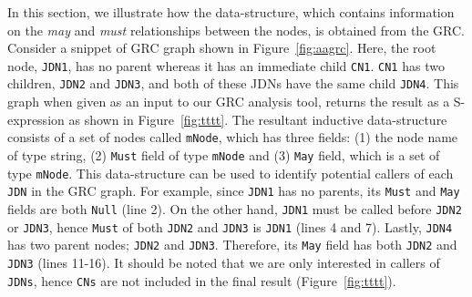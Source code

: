 In this section, we illustrate how the data-structure, which contains
information on the \textit{may} and \textit{must} relationships between
the nodes, is obtained from the GRC. Consider a snippet of GRC graph
shown in Figure~\ref{fig:aagrc}. Here, the root node, \texttt{JDN1}, has
no parent whereas it has an immediate child \texttt{CN1}. \texttt{CN1}
has two children, \texttt{JDN2} and \texttt{JDN3}, and both of these
JDNs have the same child \texttt{JDN4}. This graph when given as an
input to our GRC analysis tool, returns the result as a S-expression as
shown in Figure~\ref{fig:tttt}. The resultant inductive data-structure
consists of a set of nodes called \texttt{mNode}, which has three
fields: (1) the node name of type string, (2) \texttt{Must} field of
type \texttt{mNode} and (3) \texttt{May} field, which is a set of type
\texttt{mNode}. This data-structure can be used to identify potential
callers of each \texttt{JDN} in the GRC graph. For example, since
\texttt{JDN1} has no parents, its \texttt{Must} and \texttt{May} fields
are both \texttt{Null} (line 2).  On the other hand, \texttt{JDN1} must
be called before \texttt{JDN2} or \texttt{JDN3}, hence \texttt{Must} of
both \texttt{JDN2} and \texttt{JDN3} is \texttt{JDN1} (lines 4 and 7).
Lastly, \texttt{JDN4} has two parent nodes; \texttt{JDN2} and
\texttt{JDN3}. Therefore, its \texttt{May} field has both \texttt{JDN2}
and \texttt{JDN3} (lines 11-16). It should be noted that we are only
interested in callers of \texttt{JDNs}, hence \texttt{CNs} are not
included in the final result (Figure~\ref{fig:tttt}). %







